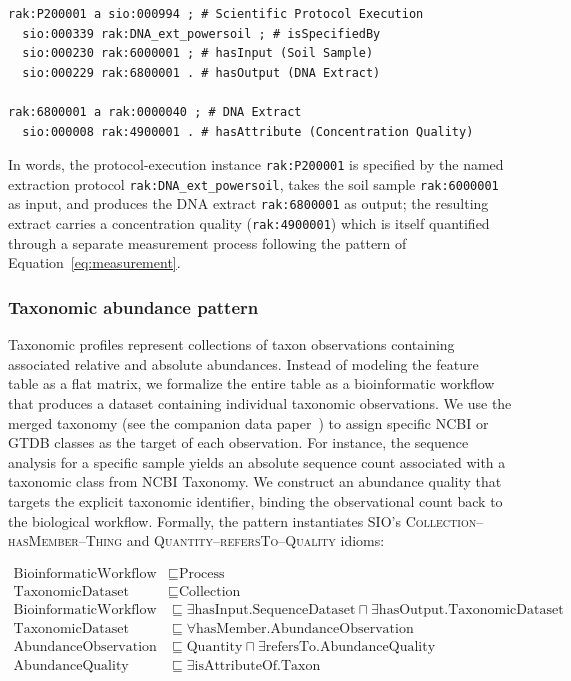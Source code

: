 \documentclass[11pt,a4paper]{article}
\begin{document}
\begin{lstlisting}[caption={Turtle representation of a DNA extraction protocol.},
  label={lst:ttl_protocol}, basicstyle=\ttfamily\scriptsize, frame=single]
rak:P200001 a sio:000994 ; # Scientific Protocol Execution
  sio:000339 rak:DNA_ext_powersoil ; # isSpecifiedBy
  sio:000230 rak:6000001 ; # hasInput (Soil Sample)
  sio:000229 rak:6800001 . # hasOutput (DNA Extract)

rak:6800001 a rak:0000040 ; # DNA Extract
  sio:000008 rak:4900001 . # hasAttribute (Concentration Quality)
\end{lstlisting}

In words, the protocol-execution instance \texttt{rak:P200001} is
specified by the named extraction protocol
\texttt{rak:DNA\_ext\_powersoil}, takes the soil sample
\texttt{rak:6000001} as input, and produces the DNA extract
\texttt{rak:6800001} as output; the resulting extract carries a
concentration quality (\texttt{rak:4900001}) which is itself
quantified through a separate measurement process following the
pattern of Equation~\ref{eq:measurement}.

\subsubsection{Taxonomic abundance pattern}

Taxonomic profiles represent collections of taxon observations
containing associated relative and absolute abundances. Instead of
modeling the feature table as a flat matrix, we formalize the entire
table as a bioinformatic workflow that produces a dataset containing
individual taxonomic observations. We use the merged taxonomy (see
the companion data paper~\cite{gigascience_companion}) to assign
specific NCBI or GTDB classes as the target of each observation.
For instance, the sequence analysis for a specific sample yields an
absolute sequence count associated with a taxonomic class from NCBI
Taxonomy. We construct an abundance quality that targets the explicit
taxonomic identifier, binding the observational count back to the
biological workflow. Formally, the pattern instantiates SIO's
\textsc{Collection--hasMember--Thing} and
\textsc{Quantity--refersTo--Quality} idioms:

\begin{align}
    \label{eq:taxabundance}
    \text{BioinformaticWorkflow} & \sqsubseteq \text{Process} \\
    \text{TaxonomicDataset} & \sqsubseteq \text{Collection} \\
    \text{BioinformaticWorkflow} & \sqsubseteq \exists
        \text{hasInput}.\text{SequenceDataset} \sqcap \exists
        \text{hasOutput}.\text{TaxonomicDataset} \\
    \text{TaxonomicDataset} & \sqsubseteq \forall
        \text{hasMember}.\text{AbundanceObservation} \\
    \text{AbundanceObservation} & \sqsubseteq \text{Quantity} \sqcap
        \exists \text{refersTo}.\text{AbundanceQuality} \\
    \text{AbundanceQuality} & \sqsubseteq \exists
        \text{isAttributeOf}.\text{Taxon}
\end{align}
\end{document}
